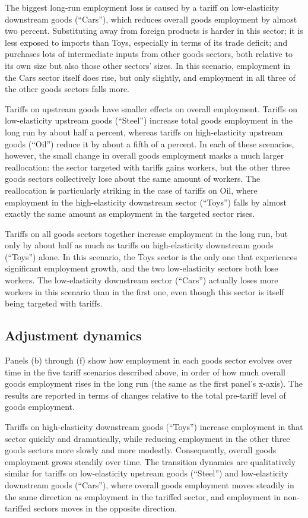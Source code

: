 \documentclass[12pt]{article}
\begin{document}
The biggest long-run employment loss is caused by a tariff on low-elasticity downstream goods (``Cars''), which reduces overall goods employment by almost two percent. Substituting away from foreign products is harder in this sector; it is less exposed to imports than Toys, especially in terms of its trade deficit; and purchases lots of intermediate inputs from other goods sectors, both relative to its own size but also those other sectors' sizes. In this scenario, employment in the Cars sector itself does rise, but only slightly, and employment in all three of the other goods sectors falls more.  

Tariffs on upstream goods have smaller effects on overall employment. Tariffs on low-elasticity upstream goods (``Steel'') increase total goods employment in the long run by about half a percent, whereas tariffs on high-elasticity upstream goods (``Oil'') reduce it by about a fifth of a percent. In each of these scenarios, however, the small change in overall goods employment masks a much larger reallocation: the sector targeted with tariffs gains workers, but the other three goods sectors collectively lose about the same amount of workers. The reallocation is particularly striking in the case of tariffs on Oil, where employment in the high-elasticity downstream sector (``Toys'') falls by almost exactly the same amount as employment in the targeted sector rises.

Tariffs on all goods sectors together increase employment in the long run, but only by about half as much as tariffs on high-elasticity downstream goods (``Toys'') alone. In this scenario, the Toys sector is the only one that experiences significant employment growth, and the two low-elasticity sectors both lose workers. The low-elasticity downstream sector (``Cars'') actually loses more workers in this scenario than in the first one, even though this sector is itself being targeted with tariffs. 

\subsection{Adjustment dynamics}
Panels (b) through (f) show how employment in each goods sector evolves over time in the five tariff scenarios described above, in order of how much overall goods employment rises in the long run (the same as the first panel's x-axis). The results are reported in terms of changes relative to the total pre-tariff level of goods employment.

Tariffs on high-elasticity downstream goods (``Toys'') increase employment in that sector quickly and dramatically, while reducing employment in the other three goods sectors more slowly and more modestly. Consequently, overall goods employment grows steadily over time. The transition dynamics are qualitatively similar for tariffs on low-elasticity upstream goods (``Steel'') and low-elasticity downstream goods (``Cars''), where overall goods employment moves steadily in the same direction as employment in the tariffed sector, and employment in non-tariffed sectors moves in the opposite direction.
\end{document}
